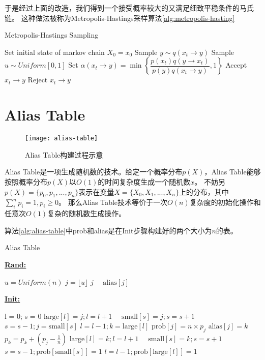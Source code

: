 于是经过上面的改造，我们得到一个接受概率较大的又满足细致平稳条件的马氏链。
这种做法被称为Metropolis-Hastings采样算法\ref{alg:metropolis-hasting}
\begin{algorithm}[htb]  
\caption{Metropolis-Hastings Sampling} 
\label{alg:metropolis-hasting} 
\begin{algorithmic}[1] 
\State Set initial state of markov chain $X_0 = x_0$
\State Sample $y \sim q(x_t \rightarrow y)$
\State Sample $u \sim Uniform[0,1]$
\State Set $\alpha( x_t \rightarrow y) = \min \left\{ \dfrac{p(x_t)q(y \rightarrow x_t)}{p(y)q(x_t \rightarrow y)}, 1\right\}$
\State Accept $x_t \rightarrow y$
\Else
\State Reject $x_t \rightarrow y$
\EndIf
\EndFor
\end{algorithmic}  
\end{algorithm}  

\section{Alias Table}
\begin{figure}[htb]\centering
\texttt{[image: alias-table]}
\caption{Alias Table构建过程示意}
\label{fig:alias-table}       %
\end{figure}
Alias Table\cite{vose1991a}是一项生成随机数的技术。给定一个概率分布$p(X)$，Alias Table能够按照概率分布$p(X)$以$O(1)$的时间复杂度生成一个随机数$x$。
不妨另$p(X) = \{p_0, p_1, ..., p_n\}$表示在变量$X=\{X_0, X_1, ..., X_n\}$上的分布，其中$\sum_i^n {p_i} = 1, p_i \ge 0$。
那么Alias Table技术等价于一次$O(n)$复杂度的初始化操作和任意次$O(1)$复杂的随机数生成操作。

算法\ref{alg:alias-table}中prob和alias是在Init步骤构建好的两个大小为$n$的表。

\begin{algorithm}[htb]  
\caption{Alias Table} 
\label{alg:alias-table}
\textbf{\underline{Rand:}}
\begin{algorithmic}[1] 
\State $u = Uniform(n)$
\State $j = \lfloor u \rfloor$
\Return $j$
\Else
~~\Return $\mbox{alias}[j]$
\EndIf
\end{algorithmic}  
\textbf{\underline{Init:}}
\begin{algorithmic}[1] 
\State l = 0; s = 0
$\mbox{large}[l] = j; l = l + 1$
\Else
~~$\mbox{small}[s] = j; s = s + 1$
\EndIf
\EndFor
{}
\State $s = s - 1; j = \mbox{small}[s]$
\State $l = l - 1; k = \mbox{large}[l]$
\State $\mbox{prob}[j] = n \times p_j$
\State $\mbox{alias}[j] = k$
\State $p_k = p_k + (p_j - \frac{1}{n})$
$\mbox{large}[l] = k; l = l + 1$
\Else
~~$\mbox{small}[s] = k; s = s + 1$
\EndIf
\EndWhile
{}
$s = s - 1; \mbox{prob}[\mbox{small}[s]] = 1$
\EndWhile
{}
$l = l - 1; \mbox{prob}[\mbox{large}[l]] = 1$ \EndWhile
\end{algorithmic}  
\end{algorithm}  

